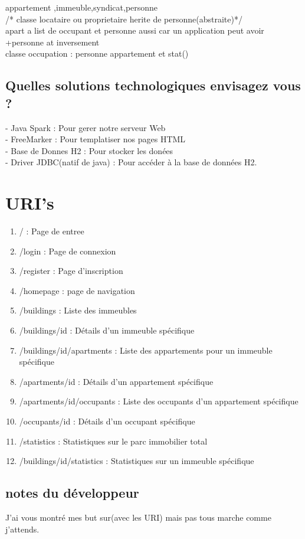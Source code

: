\documentclass{article}
\begin{document}
\noindent appartement ,immeuble,syndicat,personne\\
/* classe locataire ou proprietaire herite de personne(abstraite)*/\\
 apart a list de occupant et personne aussi car un application peut avoir +personne at inversement\\
 classe occupation : personne appartement et stat()\\

\subsection{Quelles solutions technologiques envisagez vous ?}
\noindent- Java Spark : Pour gerer notre serveur Web \\
- FreeMarker : Pour templatiser nos pages HTML \\
- Base de Donnes H2 : Pour stocker les donées \\
- Driver JDBC(natif de java) : Pour accéder à la base de données H2. \\

\section{URI's}

\begin{enumerate}
\item / : Page de entree
\item /login : Page de connexion
\item /register : Page d'inscription
\item /homepage : page de navigation
\item /buildings : Liste des immeubles
\item /buildings/{id} : Détails d'un immeuble spécifique
\item /buildings/{id}/apartments : Liste des appartements pour un immeuble spécifique
\item /apartments/{id} : Détails d'un appartement spécifique
\item /apartments/{id}/occupants : Liste des occupants d'un appartement spécifique
\item /occupants/{id} : Détails d'un occupant spécifique
\item /statistics : Statistiques sur le parc immobilier total
\item /buildings/{id}/statistics : Statistiques sur un immeuble spécifique
\end{enumerate}


\subsection{notes du développeur}
J'ai vous montré mes but sur(avec les URI) mais pas tous marche comme j'attends.
\end{document}
